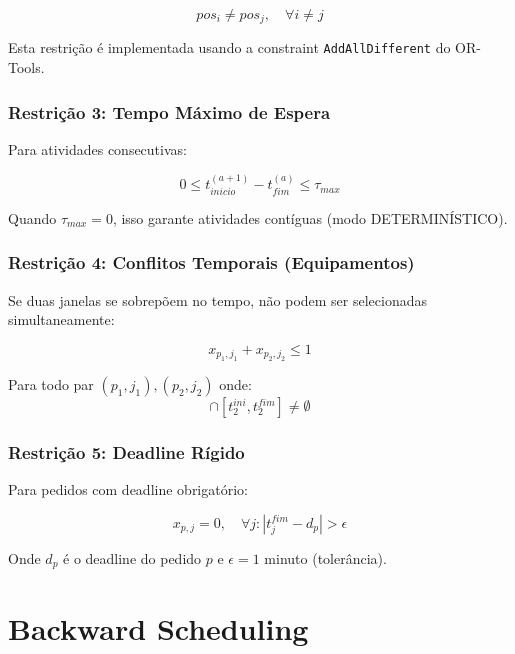 \documentclass[12pt,a4paper]{article}
\begin{document}
\begin{equation}
pos_i \neq pos_j, \quad \forall i \neq j
\end{equation}

Esta restrição é implementada usando a constraint \texttt{AddAllDifferent} do OR-Tools.

\subsubsection{Restrição 3: Tempo Máximo de Espera}

Para atividades consecutivas:

\begin{equation}
0 \leq t_{inicio}^{(a+1)} - t_{fim}^{(a)} \leq \tau_{max}
\end{equation}

Quando $\tau_{max} = 0$, isso garante atividades contíguas (modo DETERMINÍSTICO).

\subsubsection{Restrição 4: Conflitos Temporais (Equipamentos)}

Se duas janelas se sobrepõem no tempo, não podem ser selecionadas simultaneamente:

\begin{equation}
x_{p_1,j_1} + x_{p_2,j_2} \leq 1
\end{equation}

Para todo par $(p_1,j_1), (p_2,j_2)$ onde:
\begin{equation}
[t_1^{ini}, t_1^{fim}] \cap [t_2^{ini}, t_2^{fim}] \neq \emptyset
\end{equation}

\subsubsection{Restrição 5: Deadline Rígido}

Para pedidos com deadline obrigatório:

\begin{equation}
x_{p,j} = 0, \quad \forall j : |t_j^{fim} - d_p| > \epsilon
\end{equation}

Onde $d_p$ é o deadline do pedido $p$ e $\epsilon = 1$ minuto (tolerância).

\section{Backward Scheduling}
\end{document}
